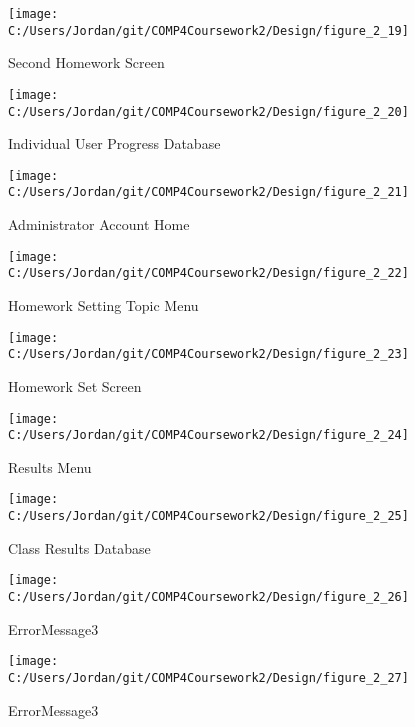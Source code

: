 \begin{figure}[H]
    \label{fig:print_function_result}\caption{Second Homework Screen}
    \texttt{[image: C:/Users/Jordan/git/COMP4Coursework2/Design/figure\_2\_19]}
\end{figure}

\begin{figure}[H]
    \label{fig:print_function_result}\caption{Individual User Progress Database}
    \texttt{[image: C:/Users/Jordan/git/COMP4Coursework2/Design/figure\_2\_20]}
\end{figure}

\begin{figure}[H]
    \label{fig:print_function_result}\caption{Administrator Account Home}
    \texttt{[image: C:/Users/Jordan/git/COMP4Coursework2/Design/figure\_2\_21]}
\end{figure}

\begin{figure}[H]
    \label{fig:print_function_result}\caption{Homework Setting Topic Menu}
    \texttt{[image: C:/Users/Jordan/git/COMP4Coursework2/Design/figure\_2\_22]}
\end{figure}

\begin{figure}[H]
    \label{fig:print_function_result}\caption{Homework Set Screen}
    \texttt{[image: C:/Users/Jordan/git/COMP4Coursework2/Design/figure\_2\_23]}
\end{figure}

\begin{figure}[H]
    \label{fig:print_function_result}\caption{Results Menu}
    \texttt{[image: C:/Users/Jordan/git/COMP4Coursework2/Design/figure\_2\_24]}
\end{figure}

\begin{figure}[H]
    \label{fig:print_function_result}\caption{Class Results Database}
    \texttt{[image: C:/Users/Jordan/git/COMP4Coursework2/Design/figure\_2\_25]}
\end{figure}

\begin{figure}[H]
    \label{fig:print_function_result}\caption{ErrorMessage3}
    \texttt{[image: C:/Users/Jordan/git/COMP4Coursework2/Design/figure\_2\_26]}
\end{figure}

\begin{figure}[H]
    \label{fig:print_function_result}\caption{ErrorMessage3}
    \texttt{[image: C:/Users/Jordan/git/COMP4Coursework2/Design/figure\_2\_27]}
\end{figure}

